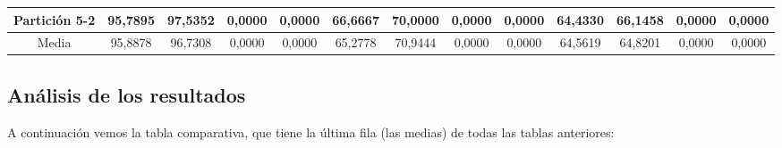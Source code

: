 \documentclass[12pt]{article}
\begin{document}
\begin{table}[H]
{\begin{tabular}{|c|cccc|cccc|cccc|}
Partición 5-2 & \multicolumn{1}{c|}{95,7895}                                                  & \multicolumn{1}{c|}{97,5352}                                                 & \multicolumn{1}{c|}{0,0000}  & 0,0000 & \multicolumn{1}{c|}{66,6667}                                                  & \multicolumn{1}{c|}{70,0000}                                                 & \multicolumn{1}{c|}{0,0000}  & 0,0000 & \multicolumn{1}{c|}{64,4330}                                                  & \multicolumn{1}{c|}{66,1458}                                                 & \multicolumn{1}{c|}{0,0000}  & 0,0000 \\ \hline
Media         & \multicolumn{1}{c|}{95,8878}                                                  & \multicolumn{1}{c|}{96,7308}                                                 & \multicolumn{1}{c|}{0,0000}  & 0,0000 & \multicolumn{1}{c|}{65,2778}                                                  & \multicolumn{1}{c|}{70,9444}                                                 & \multicolumn{1}{c|}{0,0000}  & 0,0000 & \multicolumn{1}{c|}{64,5619}                                                  & \multicolumn{1}{c|}{64,8201}                                                 & \multicolumn{1}{c|}{0,0000}  & 0,0000 \\ \hline
\end{tabular}}
\end{table}

\subsection{Análisis de los resultados}

A continuación vemos la tabla comparativa, que tiene la última fila (las medias) de todas las tablas anteriores:
\end{document}
